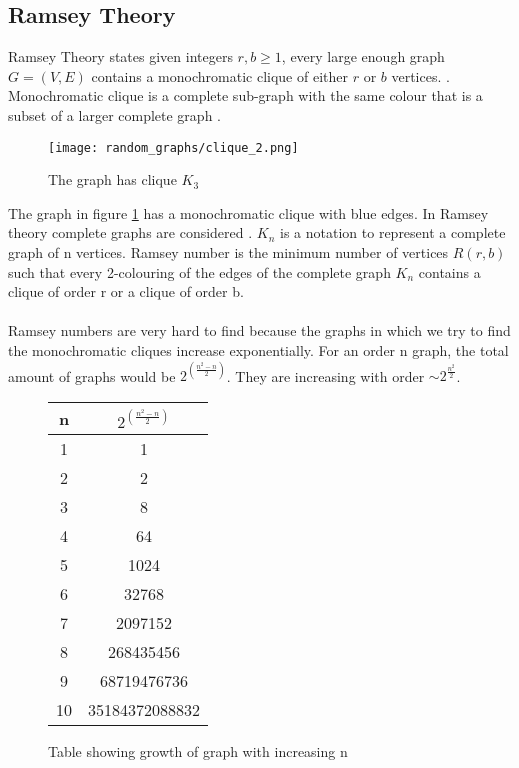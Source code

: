 \documentclass{Assignment}
\begin{document}
\subsection{Ramsey Theory}
Ramsey Theory states given integers $ r,b\geq 1$, every large enough graph $G = (V,E)$ contains a monochromatic clique of either $r$ or $b$ vertices.  \cite{katz2018introduction}.
Monochromatic clique is a complete sub-graph with the same colour that is a subset of a larger complete graph \cite{BondyMurty2008}.
\begin{figure}[H]
	\centering
	\texttt{[image: random\_graphs/clique\_2.png]}
	\caption{The graph has clique $K_3$}
	\label{clique}
\end{figure}
The graph in figure \ref{clique} has a monochromatic clique with blue edges.
In Ramsey theory complete graphs are considered \cite{burr1981generalized}.
$K_n$ is a notation to represent a complete graph of n vertices.
Ramsey number is the minimum number of vertices $R(r,b)$ such that every 2-colouring of the edges of the complete graph $K_n$ contains a clique of order r or a clique of order b.
\\\\
Ramsey numbers are very hard to find because the graphs in which we try to find the monochromatic cliques increase exponentially.
For an order n graph, the total amount of graphs would be $2^{\left(\frac{n^2-n}{2}\right)}$.
They are increasing with order $\sim 2^{\frac{n^2}{2}}$.
\begin{figure}[H]
	\begin{center}
		
		\begin{tabular}{|c|c|}
			n&$2^{\left(\frac{n^2-n}{2}\right)}$\\
			\hline
			1  & 1 \\\hline
			2  & 2 \\\hline
			3  & 8 \\\hline
			4  & 64 \\\hline
			5  & 1024 \\\hline
			6  & 32768 \\\hline
			7 & 2097152 \\\hline
			8  & 268435456 \\\hline
			9  & 68719476736 \\\hline
			10  & 35184372088832 \\
			\hline
		\end{tabular}
		
		\caption{Table showing growth of graph with increasing n}
		\label{tableofn}
	\end{center}
\end{figure}
\end{document}
